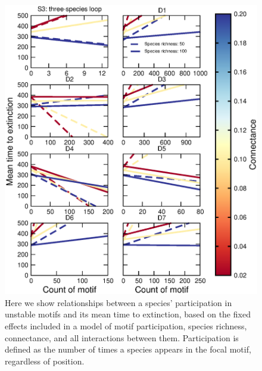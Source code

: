 \documentclass[12pt]{article}
\begin{document}
	\begin{figure}[h!]
		\caption{Here we show relationships between a species' participation in unstable motifs and its mean time to extinction, based on the fixed effects included in a model of motif participation, species richness, connectance, and all interactions between them. Participation is defined as the number of times a species appears in the focal motif, regardless of position.}
		\label{unstable_motif_lmers}
		\includegraphics[width=\textwidth]{figures/extinction_order/unstable_motif_lmer_summary_paper_full.eps}
		\end{figure}
		

\end{document}

